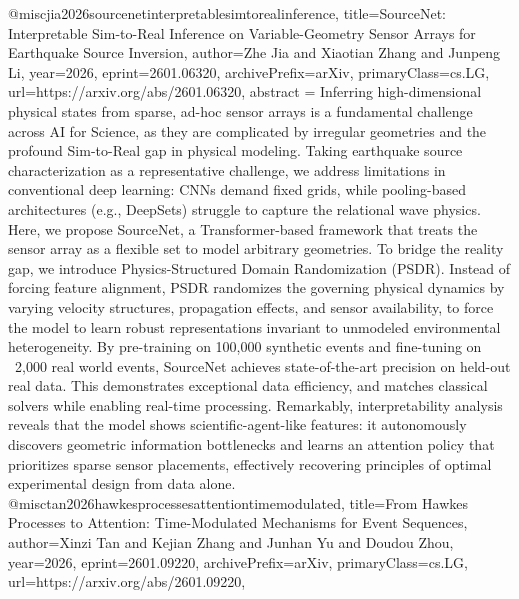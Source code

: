 {}@misc{jia2026sourcenetinterpretablesimtorealinference,
      title={SourceNet: Interpretable Sim-to-Real Inference on Variable-Geometry Sensor Arrays for Earthquake Source Inversion}, 
      author={Zhe Jia and Xiaotian Zhang and Junpeng Li},
      year={2026},
      eprint={2601.06320},
      archivePrefix={arXiv},
      primaryClass={cs.LG},
      url={https://arxiv.org/abs/2601.06320},
      abstract = {Inferring high-dimensional physical states from sparse, ad-hoc sensor arrays is a fundamental challenge across AI for Science, as they are complicated by irregular geometries and the profound Sim-to-Real gap in physical modeling. Taking earthquake source characterization as a representative challenge, we address limitations in conventional deep learning: CNNs demand fixed grids, while pooling-based architectures (e.g., DeepSets) struggle to capture the relational wave physics. Here, we propose SourceNet, a Transformer-based framework that treats the sensor array as a flexible set to model arbitrary geometries. To bridge the reality gap, we introduce Physics-Structured Domain Randomization (PSDR). Instead of forcing feature alignment, PSDR randomizes the governing physical dynamics by varying velocity structures, propagation effects, and sensor availability, to force the model to learn robust representations invariant to unmodeled environmental heterogeneity. By pre-training on 100,000 synthetic events and fine-tuning on ~2,000 real world events, SourceNet achieves state-of-the-art precision on held-out real data. This demonstrates exceptional data efficiency, and matches classical solvers while enabling real-time processing. Remarkably, interpretability analysis reveals that the model shows scientific-agent-like features: it autonomously discovers geometric information bottlenecks and learns an attention policy that prioritizes sparse sensor placements, effectively recovering principles of optimal experimental design from data alone.}
}@misc{tan2026hawkesprocessesattentiontimemodulated,
      title={From Hawkes Processes to Attention: Time-Modulated Mechanisms for Event Sequences}, 
      author={Xinzi Tan and Kejian Zhang and Junhan Yu and Doudou Zhou},
      year={2026},
      eprint={2601.09220},
      archivePrefix={arXiv},
      primaryClass={cs.LG},
      url={https://arxiv.org/abs/2601.09220},
}
